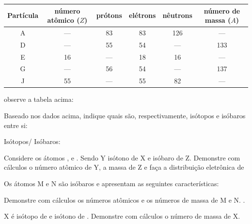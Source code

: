 \documentclass[a4paper,12]{exam}
\begin{document}
\begin{table}[h]
\centering
\begin{tabular}{c|c|c|c|c|c}
Partícula & número atômico ($Z$) & prótons & elétrons & nêutrons & número de massa ($A$)  \\ 
\hline
A         & ---                  & 83      & 83       & 126      & ---                    \\
D         & ---                  & 55      & 54       & ---      & 133                    \\
E         & 16                   & ---     & 18       & 16       & ---                    \\
G         & ---                  & 56      & 54       & ---      & 137                    \\
J         & 55                   & ---     & 55       & 82       & ---                   
\end{tabular}
\end{table}

\begin{multicols}{2}
  	\begin{questions}
	  \question observe a tabela acima:
	  
Baseado nos dados acima, indique quais são, respectivamente, isótopos e isóbaros entre si:

Isótopos/ Isóbaros:
	  	\makeemptybox{2cm}
	  
	  \question Considere os átomos ,  e . Sendo Y isótono de X e isóbaro de Z. Demonstre com cálculos o número atômico de Y, a massa de Z e faça a distribuição eletrônica de  
	  	\makeemptybox{2cm}
	  	
	  \question Os átomos M e N são isóbaros e apresentam as seguintes características:
	  \begin{center}
	   
	  \end{center}
	  
	  Demonstre com cálculos os números atômicos e os
	  números de massa de M e N. .	\makeemptybox{2cm}
	  
	  \question X é isótopo de  e isótono de . Demonstre com cálculos o número de massa de X. 
	  	\makeemptybox{2cm}
	  
	  
	 \end{questions}
\end{multicols}
\end{document}
